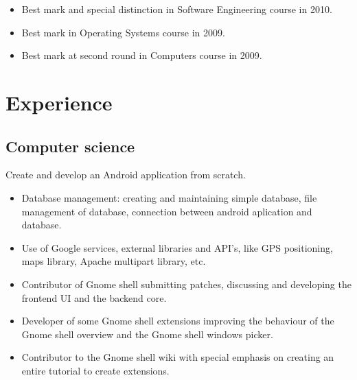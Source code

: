 {
    \begin{itemize}
        \item Best mark and special distinction in Software Engineering course in 2010.
        \item Best mark in Operating Systems course in 2009.
        \item Best mark at second round in Computers course in 2009.
    \end{itemize}
}



\section{Experience}

\subsection{Computer science}
{
    Create and develop an Android application from scratch.
    \begin{itemize}
      \item Database management: creating and maintaining simple database, file management of database, connection between android aplication and database.
      \item Use of Google services, external libraries and API's, like GPS positioning, maps library, Apache multipart library, etc.
    \end{itemize}
}

{
    \begin{itemize}
      \item Contributor of Gnome shell submitting patches, discussing and developing the frontend UI and the backend core.
      \item Developer of some Gnome shell extensions improving the behaviour of the Gnome shell overview and the Gnome shell windows picker.
      \item Contributor to the Gnome shell wiki with special emphasis on creating an entire tutorial to create extensions.
    \end{itemize}
}


